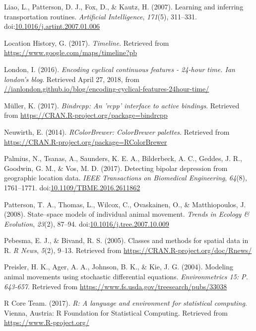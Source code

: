 \documentclass[man]{apa6}
\theoremstyle{definition}
\theoremstyle{definition}
\theoremstyle{definition}
\theoremstyle{remark}
\begin{document}
\hypertarget{ref-liao_learning_2007}{}
Liao, L., Patterson, D. J., Fox, D., \& Kautz, H. (2007). Learning and
inferring transportation routines. \emph{Artificial Intelligence},
\emph{171}(5), 311--331.
doi:\href{https://doi.org/10.1016/j.artint.2007.01.006}{10.1016/j.artint.2007.01.006}

\hypertarget{ref-location_history_timeline_2017}{}
Location History, G. (2017). \emph{Timeline}. Retrieved from
\url{https://www.google.com/maps/timeline?pb}

\hypertarget{ref-london_encoding_2016}{}
London, I. (2016). \emph{Encoding cyclical continuous features - 24-hour
time. Ian london's blog}. Retrieved April 27, 2018, from
\url{//ianlondon.github.io/blog/encoding-cyclical-features-24hour-time/}

\hypertarget{ref-R-bindrcpp}{}
Müller, K. (2017). \emph{Bindrcpp: An 'rcpp' interface to active
bindings}. Retrieved from
\url{https://CRAN.R-project.org/package=bindrcpp}

\hypertarget{ref-R-RColorBrewer}{}
Neuwirth, E. (2014). \emph{RColorBrewer: ColorBrewer palettes}.
Retrieved from \url{https://CRAN.R-project.org/package=RColorBrewer}

\hypertarget{ref-palmius_detecting_2017}{}
Palmius, N., Tsanas, A., Saunders, K. E. A., Bilderbeck, A. C., Geddes,
J. R., Goodwin, G. M., \& Vos, M. D. (2017). Detecting bipolar
depression from geographic location data. \emph{IEEE Transactions on
Biomedical Engineering}, \emph{64}(8), 1761--1771.
doi:\href{https://doi.org/10.1109/TBME.2016.2611862}{10.1109/TBME.2016.2611862}

\hypertarget{ref-patterson_statespace_2008}{}
Patterson, T. A., Thomas, L., Wilcox, C., Ovaskainen, O., \&
Matthiopoulos, J. (2008). State--space models of individual animal
movement. \emph{Trends in Ecology \& Evolution}, \emph{23}(2), 87--94.
doi:\href{https://doi.org/10.1016/j.tree.2007.10.009}{10.1016/j.tree.2007.10.009}

\hypertarget{ref-R-sp}{}
Pebesma, E. J., \& Bivand, R. S. (2005). Classes and methods for spatial
data in R. \emph{R News}, \emph{5}(2), 9--13. Retrieved from
\url{https://CRAN.R-project.org/doc/Rnews/}

\hypertarget{ref-preisler_modeling_2004}{}
Preisler, H. K., Ager, A. A., Johnson, B. K., \& Kie, J. G. (2004).
Modeling animal movements using stochastic differential equations.
\emph{Environmetrics 15: P. 643-657}. Retrieved from
\url{https://www.fs.usda.gov/treesearch/pubs/33038}

\hypertarget{ref-R-base}{}
R Core Team. (2017). \emph{R: A language and environment for statistical
computing}. Vienna, Austria: R Foundation for Statistical Computing.
Retrieved from \url{https://www.R-project.org/}
\end{document}
